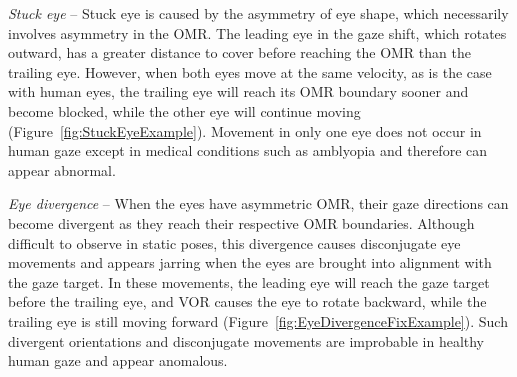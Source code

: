 \noindent\emph{Stuck eye} -- Stuck eye is caused by the asymmetry of eye shape, which necessarily involves asymmetry in the OMR. The leading eye in the gaze shift, which rotates outward, has a greater distance to cover before reaching the OMR than the trailing eye. However, when both eyes move at the same velocity, as is the case with human eyes, the trailing eye will reach its OMR boundary sooner and become blocked, while the other eye will continue moving (Figure~\ref{fig:StuckEyeExample}). Movement in only one eye does not occur in human gaze except in medical conditions such as amblyopia and therefore can appear abnormal.

\noindent\emph{Eye divergence} -- When the eyes have asymmetric OMR, their gaze directions can become divergent as they reach their respective OMR boundaries. Although difficult to observe in static poses, this divergence causes disconjugate eye movements and appears jarring when the eyes are brought into alignment with the gaze target. In these movements, the leading eye will reach the gaze target before the trailing eye, and VOR causes the eye to rotate backward, while the trailing eye is still moving forward (Figure~\ref{fig:EyeDivergenceFixExample}). %
Such divergent orientations and disconjugate movements are improbable in healthy human gaze and appear anomalous. 